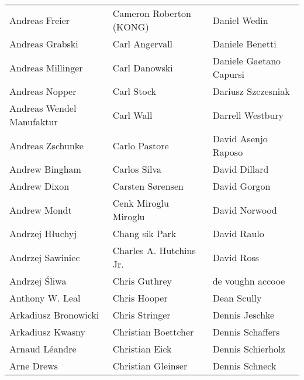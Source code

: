 \begin{tabular}{p{4.5cm}p{4.5cm}p{4.5cm}}
Andreas Freier & Cameron Roberton (KONG) & Daniel Wedin \\
Andreas Grabski & Carl Angervall & Daniele Benetti \\
Andreas Millinger & Carl Danowski & Daniele Gaetano Capursi \\
Andreas Nopper & Carl Stock & Dariusz Szczesniak \\
Andreas Wendel Manufaktur & Carl Wall & Darrell Westbury \\
Andreas Zschunke & Carlo Pastore & David Asenjo Raposo \\
Andrew Bingham & Carlos Silva & David Dillard \\
Andrew Dixon & Carsten Sørensen & David Gorgon \\
Andrew Mondt & Cenk Miroglu Miroglu & David Norwood \\
Andrzej Hłuchyj & Chang sik Park & David Raulo \\
Andrzej Sawiniec & Charles A. Hutchins Jr. & David Ross \\
Andrzej Śliwa & Chris Guthrey & de voughn accooe \\
Anthony W. Leal & Chris Hooper & Dean Scully \\
Arkadiusz Bronowicki & Chris Stringer & Dennis Jeschke \\
Arkadiusz Kwasny & Christian Boettcher & Dennis Schaffers \\
Arnaud Léandre & Christian Eick & Dennis Schierholz \\
Arne Drews & Christian Gleinser & Dennis Schneck \\
\end{tabular}
\newpage
\setlength{\tabcolsep}{1mm}
